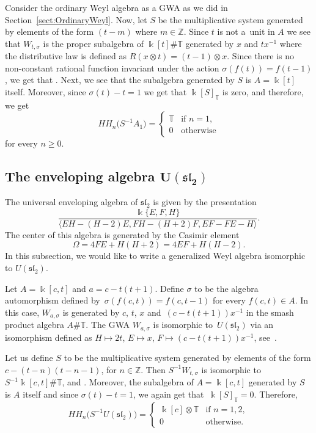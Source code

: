 \documentclass[10pt,a4paper]{amsart}
\newcommand{\G}[1]{\mathfrak{#1}}
\newcommand{\B}[1]{\mathbb{#1}}
\newcommand{\CH}{{\rm CH}}
\renewcommand{\geq}{\geqslant}
\numberwithin{equation}{section}
\begin{document}
Consider the ordinary Weyl algebra as a GWA as we did in Section~\ref{sect:OrdinaryWeyl}. Now,
let $S$ be the multiplicative system generated by elements of the form $(t-m)$ where $m\in\B{Z}$.
Since $t$ is not a~unit in $A$ we see that $W_{t,\sigma}$ is the proper subalgebra of
$\Bbbk[t]\# \B{T}$ generated by $x$ and $tx^{-1}$ where the distributive law is defined as
$R(x\otimes t) = (t-1)\otimes x$. Since there is no non-constant rational function invariant under
the action $\sigma(f(t))=f(t-1)$, we get that \smash{$\CH_*\bigl(S^{-1}\Bbbk[t]\bigr)^{\B{T}} = \CH_*(\Bbbk)$}. Next,
we see that the subalgebra generated by $S$ is $A=\Bbbk[t]$ itself. Moreover, since $\sigma(t)-t=1$
we get that $\Bbbk[S]_{\B{T}}$ is zero, and therefore, we get
\[
 HH_n\bigl(S^{-1}A_1\bigr) =
 \begin{cases}
 \B{T} & \text{if } n=1,\\
 0 & \text{otherwise}
 \end{cases}
\]
for every $n\geq 0$.

\subsection[The enveloping algebra U(G sl\_2)]{The enveloping algebra $\boldsymbol{U(\G{sl}_2)}$}\label{sect:Usl2}

The universal enveloping algebra of $\G{sl}_2$ is given by the presentation
\[ \frac{\Bbbk\{E,F,H\}}{\langle EH-(H-2)E, FH - (H+2)F, EF-FE-H \rangle}. \] The center
of this algebra is generated by the Casimir element
\[ \Omega = 4 FE + H(H + 2) = 4EF + H(H - 2). \] In this subsection, we would like to write
a generalized Weyl algebra isomorphic to $U(\G{sl}_2)$.

Let $A=\Bbbk[c,t]$ and $a=c-t(t+1)$. Define $\sigma$ to be the algebra automorphism
defined by~${\sigma(f(c,t)) = f(c,t-1)}$ for every $f(c,t)\in A$. In this case,
$W_{a,\sigma}$ is generated by $c$, $t$, $x$ and~${(c-t(t+1))x^{-1}}$ in the smash product
algebra $A\# \B{T}$. The GWA $W_{a,\sigma}$ is isomorphic to~$U(\G{sl}_2)$ via an
isomorphism defined as
$H\mapsto 2t$, $ E\mapsto x$, $ F\mapsto (c-t(t+1))x^{-1}$,
see~\cite[Example~2.2]{FarinatiSolotarAlvarez:GeneralizedWeyAlgebras}.

Let us define $S$ to be the multiplicative system generated by elements of the form
$c-(t-n)(t-n-1)$, for $ n\in\B{Z}$.
Then $S^{-1}W_{t,\sigma}$ is isomorphic to $S^{-1}\Bbbk[c,t]\# \B{T}$, and
\smash{$\CH_*\bigl(S^{-1}A\bigr)^{\B{T}}=\CH_*(\Bbbk[c])$}. Moreover, the subalgebra of $A=\Bbbk[c,t]$ generated by
$S$ is $A$ itself and since $\sigma(t)-t = 1$, we again get that~${\Bbbk[S]_{\B{T}}=0}$.
Therefore,
\[
 HH_n\bigl(S^{-1}U(\G{sl}_2)\bigr) =
 \begin{cases}
 \Bbbk[c]\otimes \B{T} & \text{if } n=1,2,\\
 0 & \text{otherwise}.
 \end{cases}
\]
\end{document}
